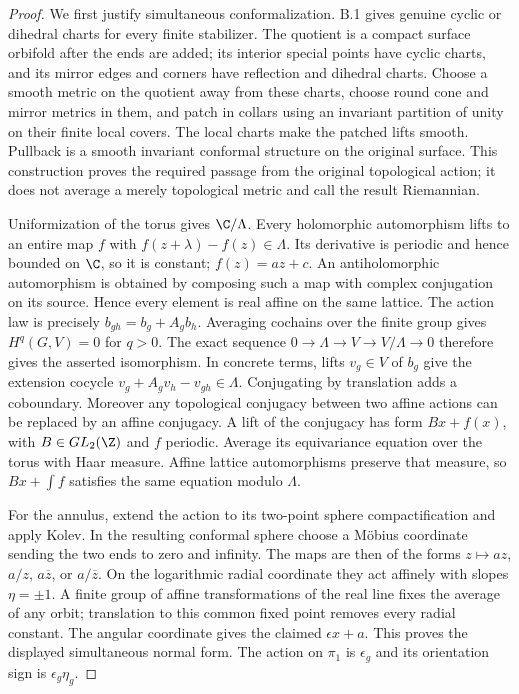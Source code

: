 \begin{proof}
We first justify simultaneous conformalization. B.1 gives genuine cyclic or
dihedral charts for every finite stabilizer. The quotient is a compact
surface orbifold after the ends are added; its interior special points have
cyclic charts, and its mirror edges and corners have reflection and dihedral
charts. Choose a smooth metric on the quotient away from these charts, choose
round cone and mirror metrics in them, and patch in collars using an invariant
partition of unity on their finite local covers. The local charts make the
patched lifts smooth. Pullback is a smooth invariant conformal structure on
the original surface. This construction proves the required passage from the
original topological action; it does not average a merely topological metric
and call the result Riemannian.

Uniformization of the torus gives $\C/\Lambda$. Every holomorphic automorphism
lifts to an entire map $f$ with $f(z+\lambda)-f(z)\in\Lambda$. Its derivative
is periodic and hence bounded on $\C$, so it is constant; $f(z)=az+c$.
An antiholomorphic automorphism is obtained by composing such a map with
complex conjugation on its source. Hence every element is real affine on the
same lattice. The action law is precisely
$b_{gh}=b_g+A_gb_h$. Averaging cochains over the finite group gives
$H^q(G,V)=0$ for $q>0$. The exact sequence
$0\to\Lambda\to V\to V/\Lambda\to0$ therefore gives the asserted isomorphism.
In concrete terms, lifts $v_g\in V$ of $b_g$ give the extension cocycle
$v_g+A_gv_h-v_{gh}\in\Lambda$. Conjugating by translation adds a coboundary.
Moreover any topological conjugacy between two affine actions can be replaced
by an affine conjugacy. A lift of the conjugacy has form $Bx+f(x)$, with
$B\in GL_2(\Z)$ and $f$ periodic. Average its equivariance equation over the
torus with Haar measure. Affine lattice automorphisms preserve that measure,
so $Bx+\int f$ satisfies the same equation modulo $\Lambda$.

For the annulus, extend the action to its two-point sphere compactification
and apply Kolev. In the resulting conformal sphere choose a M\"obius coordinate
sending the two ends to zero and infinity. The maps are then of the forms
$z\mapsto az$, $a/z$, $a\overline z$, or $a/\overline z$. On the logarithmic
radial coordinate they act affinely with slopes $\eta=\pm1$. A finite group
of affine transformations of the real line fixes the average of any orbit;
translation to this common fixed point removes every radial constant. The
angular coordinate gives the claimed $\epsilon x+a$. This proves the displayed
simultaneous normal form. The action on $\pi_1$ is $\epsilon_g$ and its
orientation sign is $\epsilon_g\eta_g$.


\end{proof}
